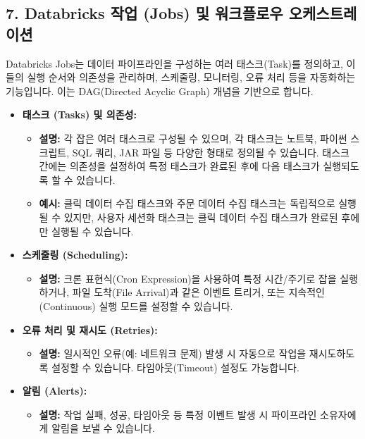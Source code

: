 \documentclass[11pt,a4paper]{article}
\begin{document}
\subsection*{7. Databricks 작업 (Jobs) 및 워크플로우 오케스트레이션}

Databricks Jobs는 데이터 파이프라인을 구성하는 여러 태스크(Task)를 정의하고, 이들의 실행 순서와 의존성을 관리하며, 스케줄링, 모니터링, 오류 처리 등을 자동화하는 기능입니다. 이는 DAG(Directed Acyclic Graph) 개념을 기반으로 합니다.

\begin{tcolorbox}[title=\textbf{Databricks Jobs의 주요 기능}, colback=blue!5!white, colframe=blue!75!black, sharp corners, boxrule=0.8pt]
\begin{itemize}
    \item \textbf{태스크 (Tasks) 및 의존성:}
    \begin{itemize}
        \item \textbf{설명:} 각 잡은 여러 태스크로 구성될 수 있으며, 각 태스크는 노트북, 파이썬 스크립트, SQL 쿼리, JAR 파일 등 다양한 형태로 정의될 수 있습니다. 태스크 간에는 의존성을 설정하여 특정 태스크가 완료된 후에 다음 태스크가 실행되도록 할 수 있습니다.
        \item \textbf{예시:} 클릭 데이터 수집 태스크와 주문 데이터 수집 태스크는 독립적으로 실행될 수 있지만, 사용자 세션화 태스크는 클릭 데이터 수집 태스크가 완료된 후에만 실행될 수 있습니다.
    \end{itemize}
    \item \textbf{스케줄링 (Scheduling):}
    \begin{itemize}
        \item \textbf{설명:} 크론 표현식(Cron Expression)을 사용하여 특정 시간/주기로 잡을 실행하거나, 파일 도착(File Arrival)과 같은 이벤트 트리거, 또는 지속적인(Continuous) 실행 모드를 설정할 수 있습니다.
    \end{itemize}
    \item \textbf{오류 처리 및 재시도 (Retries):}
    \begin{itemize}
        \item \textbf{설명:} 일시적인 오류(예: 네트워크 문제) 발생 시 자동으로 작업을 재시도하도록 설정할 수 있습니다. 타임아웃(Timeout) 설정도 가능합니다.
    \end{itemize}
    \item \textbf{알림 (Alerts):}
    \begin{itemize}
        \item \textbf{설명:} 작업 실패, 성공, 타임아웃 등 특정 이벤트 발생 시 파이프라인 소유자에게 알림을 보낼 수 있습니다.

\end{itemize}
\end{itemize}
\end{tcolorbox}
\end{document}

